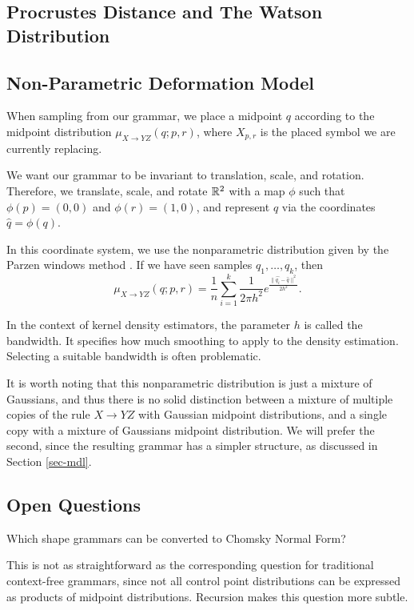 

\subsection{Procrustes Distance and The Watson Distribution}

\subsection{Non-Parametric Deformation Model}

When sampling from our grammar, we place a midpoint $q$ according to
the midpoint distribution $\mu_{X\to YZ}(q; p, r)$, where $X_{p,r}$ is
the placed symbol we are currently replacing.

We want our grammar to be invariant to translation, scale, and
rotation. Therefore, we translate, scale, and rotate $\mathbb{R}^2$ with a
map $\phi$ such that $\phi(p) =(0,0)$ and $\phi(r) =(1,0)$, and
represent $q$ via the coordinates $\widehat{q} = \phi(q)$.

In this coordinate system, we use the nonparametric distribution given
by the Parzen windows method \cite{parzen}. If we have seen samples
$q_1, \dots, q_k$, then
$$\mu_{X\to YZ}(q ; p, r) = \frac{1}{n} \sum_{i=1}^{k}
\frac{1}{2\pi h^2} e^{\frac{\| \widehat{q_i} - \widehat{q}\|^2}{2h^2}}.$$

In the context of kernel density estimators, the parameter $h$ is
called the bandwidth. It specifies how much smoothing to apply to the
density estimation. Selecting a suitable bandwidth is often
problematic. 

It is worth noting that this nonparametric distribution is just a
mixture of Gaussians, and thus there is no solid distinction between a
mixture of multiple copies of the rule $X\to YZ$ with Gaussian
midpoint distributions, and a single copy with a mixture of Gaussians
midpoint distribution. We will prefer the second, since the resulting
grammar has a simpler structure, as discussed in Section \ref{sec-mdl}.


\subsection{Open Questions}

Which shape grammars can be converted to Chomsky Normal Form?

This is not as straightforward as the corresponding question for
traditional context-free grammars, since not all control point
distributions can be expressed as products of midpoint
distributions. Recursion makes this question more subtle.

